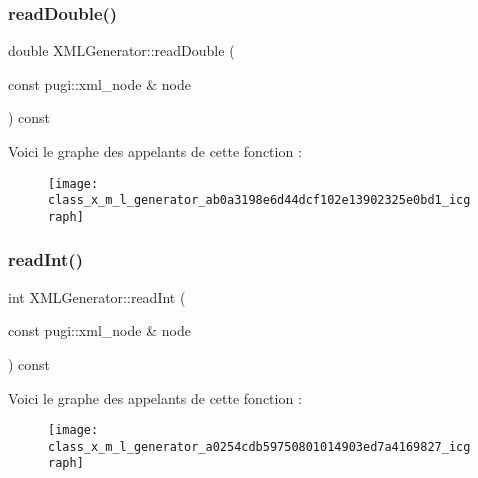 \subsubsection{\texorpdfstring{read\+Double()}{readDouble()}}
{\footnotesize\ttfamily double X\+M\+L\+Generator\+::read\+Double (\begin{DoxyParamCaption}\item[{const pugi\+::xml\+\_\+node \&}]{node }\end{DoxyParamCaption}) const\hspace{0.3cm}{\ttfamily [private]}}

Voici le graphe des appelants de cette fonction \+:\nopagebreak
\begin{figure}[H]
\begin{center}
\leavevmode
\texttt{[image: class\_x\_m\_l\_generator\_ab0a3198e6d44dcf102e13902325e0bd1\_icgraph]}
\end{center}
\end{figure}
\mbox{\label{class_x_m_l_generator_a0254cdb59750801014903ed7a4169827}} 
\subsubsection{\texorpdfstring{read\+Int()}{readInt()}}
{\footnotesize\ttfamily int X\+M\+L\+Generator\+::read\+Int (\begin{DoxyParamCaption}\item[{const pugi\+::xml\+\_\+node \&}]{node }\end{DoxyParamCaption}) const\hspace{0.3cm}{\ttfamily [private]}}

Voici le graphe des appelants de cette fonction \+:\nopagebreak
\begin{figure}[H]
\begin{center}
\leavevmode
\texttt{[image: class\_x\_m\_l\_generator\_a0254cdb59750801014903ed7a4169827\_icgraph]}
\end{center}
\end{figure}
\mbox{\label{class_x_m_l_generator_abf2e3d3b2d44fdd1e01d0f2bbca7f028}} 

